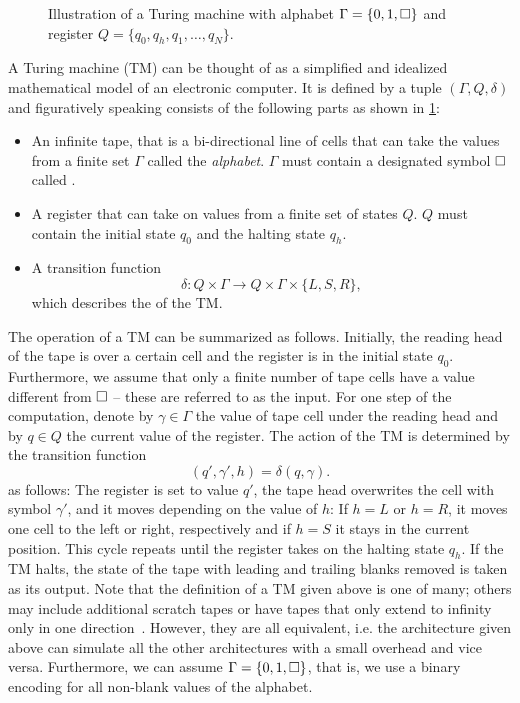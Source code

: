 \begin{figure*}
  \centering
  
  \caption{%
    Illustration of a Turing machine with alphabet $\Gamma = \{0, 1, \square\}$ and register $Q = \{q_0, q_h, q_1, \ldots, q_N\}$.
    }%
  \label{fig:complexity.turingmachine}
\end{figure*}

A Turing machine (TM) can be thought of as a simplified and idealized mathematical model of an electronic computer.
It is defined by a tuple $(\Gamma, Q, \delta)$ and figuratively speaking consists of the following parts as shown in \cref{fig:complexity.turingmachine}:
\begin{itemize}
  \item An infinite tape, that is a bi-directional line of cells that can take the values from a finite set $\Gamma$ called the \emph{alphabet}.
    $\Gamma$ must contain a designated symbol $\square$ called .
  \item A register that can take on values from a finite set of states $Q$.
    $Q$ must contain the initial state $q_0$ and the halting state $q_h$.
  \item A transition function
    \[
      \delta\colon Q \times \Gamma \to Q \times \Gamma \times \{L, S, R\},
    \]
    which describes the  of the TM.
\end{itemize}
The operation of a TM can be summarized as follows.
Initially, the reading head of the tape is over a certain cell and the register is in the initial state $q_0$.
Furthermore, we assume that only a finite number of tape cells have a value different from $\square$ -- these are referred to as the input.
For one step of the computation, denote by $\gamma \in \Gamma$ the value of tape cell under the reading head and by $q \in Q$ the current value of the register.
The action of the TM is determined by the transition function
\[
  (q', \gamma', h) = \delta(q, \gamma).
\]
as follows:
The register is set to value $q'$, the tape head overwrites the cell with symbol $\gamma'$, and it moves depending on the value of $h$:
If $h = L$ or $h = R$, it moves one cell to the left or right, respectively and if $h = S$ it stays in the current position.
This cycle repeats until the register takes on the halting state $q_h$.
If the TM halts, the state of the tape with leading and trailing blanks removed is taken as its output.
Note that the definition of a TM given above is one of many; others may include additional scratch tapes or have tapes that only extend to infinity only in one direction~\cite{Arora_2009_Computational}.
However, they are all equivalent, i.e. the architecture given above can simulate all the other architectures with a small overhead and vice versa.
Furthermore, we can assume $\Gamma = \{0, 1, \square\}$, that is, we use a binary encoding for all non-blank values of the alphabet.


